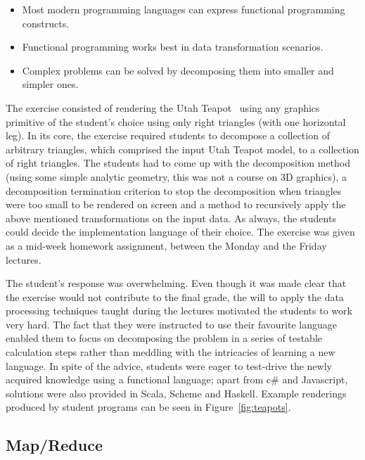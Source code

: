 \documentclass[conference]{IEEEtran}
\begin{document}
\begin{itemize}

  \item Most modern programming languages can express functional programming
    constructs.

  \item Functional programming works best in data transformation scenarios.

  \item Complex problems can be solved by decomposing them into smaller and simpler ones.

\end{itemize}

The exercise consisted of rendering the Utah Teapot~\cite{Torre06} using any
graphics primitive of the student's choice using only right triangles (with one
horizontal leg).  In its
core, the exercise required students to decompose a collection of arbitrary triangles, which
comprised the input Utah Teapot model, to a collection of right triangles. The students
had to come up with the decomposition method (using some simple analytic
geometry, this was not a course on 3D graphics), a decomposition termination criterion to stop the decomposition when
triangles were too small to be rendered on screen and a method to recursively
apply the above mentioned transformations on the input data. As always, the
students could decide the implementation language of their choice. The exercise
was given as a mid-week homework assignment, between the Monday and the Friday
lectures.

The student's response was overwhelming. Even though it was made clear that the
exercise would not contribute to the final grade, the will to apply the data
processing techniques taught during the lectures motivated the students to work
very hard. The fact that they were instructed to use their favourite language
enabled them to focus on decomposing the problem in a series of testable
calculation steps rather than meddling with the intricacies of learning a new 
language. In spite of the advice, students were eager to test-drive the newly
acquired knowledge using a functional language; apart from {\sc c\#} and
Javascript, solutions were also provided in Scala, Scheme and Haskell. Example
renderings produced by student programs can be seen in Figure~\ref{fig:teapots}.

\subsection{Map/Reduce}
\end{document}
